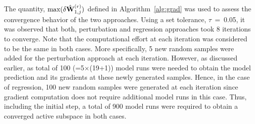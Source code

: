 %
The quantity, $\max(\delta \hat{\mathbf{{W}}}_{1,j}^{(r)})$ defined in Algorithm~\ref{alg:grad} was
used to assess the convergence behavior of the two approaches. Using a set tolerance, $\tau$~=~0.05,
it was observed that both, perturbation and regression approaches took 8 iterations to converge. 
Note that the computational effort at each iteration was considered to be the same in both cases.
More specifically, 5 new random samples were added for the perturbation approach at each iteration.
However, as discussed earlier, as total of 100 (=5$\times$(19+1)) model runs were needed to obtain the
model prediction and its gradients at these newly generated samples. Hence, in the case of
regression, 100 new random samples were generated at each iteration since gradient computation does
not require additional model runs in this case. Thus, including the initial step, a total of 900
model runs were required to obtain a converged active subspace in both cases. 

